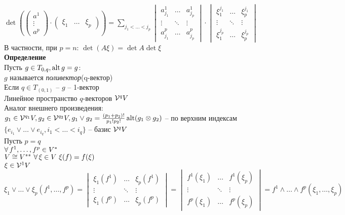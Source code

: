 \documentclass[12pt]{article}
\begin{document}
$\det(\begin{pmatrix}
    a^1\\\vdots\\a^p
\end{pmatrix}\cdot \begin{pmatrix}
    \xi_1 & \ldots & \xi_p
\end{pmatrix}) = \sum_{j_1<\ldots < j_p} \begin{vmatrix}
    a^1_{j_1} & \ldots & a^1_{j_p}\\
    \vdots & \ddots & \vdots\\
    a^p_{j_1} & \ldots & a^p_{j_p}
\end{vmatrix}\cdot \begin{vmatrix}
    \xi_1^{j_1} & \ldots & \xi_p^{j_1}\\
    \vdots & \ddots & \vdots\\
    \xi_1^{j_p} & \ldots & \xi_p^{j_p}
\end{vmatrix}$\\
В частности, при $p=n$: $\det(A\xi) = \det A \det \xi$\\
\textbf{Определение}\\
Пусть $g \in T_{0,q}, \operatorname{alt} g = g$:\\
$g$ называется \textit{поливектор}(q-вектор)\\
Если $q \in T_{(0,1)}$ -- $g$ -- 1-вектор\\
Линейное пространство $q$-векторов $\mathcal V^qV$\\
Аналог внешнего произведения: $g_1 \in \mathcal V^{q_1}V, g_2 \in \mathcal V^{q_2} V, g_1\lor g_2 = \frac{(p_1+p_2)!}{p_1!p_2!}\operatorname{alt}(g_1 \otimes g_2)$ -- по верхним индексам\\
$\{e_{i_1}\lor \ldots \lor e_{i_q}, i_1 < \ldots < i_q\}$ -- базис $\mathcal V^qV$\\
Пусть $p=q$\\
$\forall\, f^1, \ldots, f^p \in V^*$\\
$V \cong V^{**}\ \forall\, \xi \in V\ \xi(f) = f(\xi)$\\
$\xi \in \mathcal V^1 V$\\
$\xi_1\lor \ldots\lor\xi_p(f^1, \ldots, f^p) = \begin{vmatrix}
    \xi_1(f^1) & \ldots & \xi_p(f^1)\\
    \vdots & \ddots & \vdots\\
    \xi_1(f^p) & \ldots & \xi_p(f^p)
\end{vmatrix} = \begin{vmatrix}
    f^1(\xi_1) & \ldots & f^1(\xi_p)\\
    \vdots & \ddots & \vdots\\
    f^p(\xi_1) & \ldots & f^p(\xi_p)
\end{vmatrix} = f^1\land \ldots \land f^p(\xi_1,\ldots,\xi_p)$
\end{document}
